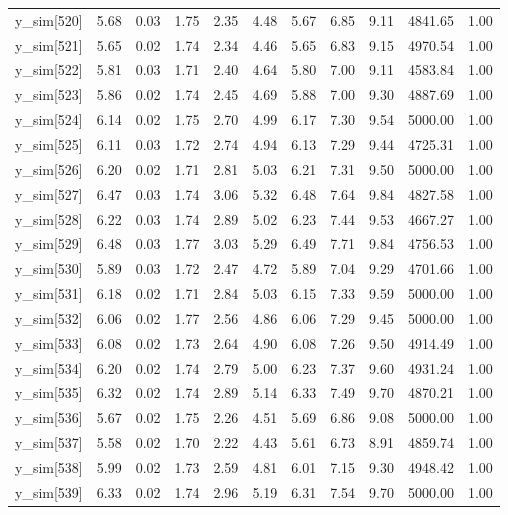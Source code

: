 \begin{table}[ht]
\begin{tabular}{rrrrrrrrrrr}
  y\_sim[520] & 5.68 & 0.03 & 1.75 & 2.35 & 4.48 & 5.67 & 6.85 & 9.11 & 4841.65 & 1.00 \\ 
  y\_sim[521] & 5.65 & 0.02 & 1.74 & 2.34 & 4.46 & 5.65 & 6.83 & 9.15 & 4970.54 & 1.00 \\ 
  y\_sim[522] & 5.81 & 0.03 & 1.71 & 2.40 & 4.64 & 5.80 & 7.00 & 9.11 & 4583.84 & 1.00 \\ 
  y\_sim[523] & 5.86 & 0.02 & 1.74 & 2.45 & 4.69 & 5.88 & 7.00 & 9.30 & 4887.69 & 1.00 \\ 
  y\_sim[524] & 6.14 & 0.02 & 1.75 & 2.70 & 4.99 & 6.17 & 7.30 & 9.54 & 5000.00 & 1.00 \\ 
  y\_sim[525] & 6.11 & 0.03 & 1.72 & 2.74 & 4.94 & 6.13 & 7.29 & 9.44 & 4725.31 & 1.00 \\ 
  y\_sim[526] & 6.20 & 0.02 & 1.71 & 2.81 & 5.03 & 6.21 & 7.31 & 9.50 & 5000.00 & 1.00 \\ 
  y\_sim[527] & 6.47 & 0.03 & 1.74 & 3.06 & 5.32 & 6.48 & 7.64 & 9.84 & 4827.58 & 1.00 \\ 
  y\_sim[528] & 6.22 & 0.03 & 1.74 & 2.89 & 5.02 & 6.23 & 7.44 & 9.53 & 4667.27 & 1.00 \\ 
  y\_sim[529] & 6.48 & 0.03 & 1.77 & 3.03 & 5.29 & 6.49 & 7.71 & 9.84 & 4756.53 & 1.00 \\ 
  y\_sim[530] & 5.89 & 0.03 & 1.72 & 2.47 & 4.72 & 5.89 & 7.04 & 9.29 & 4701.66 & 1.00 \\ 
  y\_sim[531] & 6.18 & 0.02 & 1.71 & 2.84 & 5.03 & 6.15 & 7.33 & 9.59 & 5000.00 & 1.00 \\ 
  y\_sim[532] & 6.06 & 0.02 & 1.77 & 2.56 & 4.86 & 6.06 & 7.29 & 9.45 & 5000.00 & 1.00 \\ 
  y\_sim[533] & 6.08 & 0.02 & 1.73 & 2.64 & 4.90 & 6.08 & 7.26 & 9.50 & 4914.49 & 1.00 \\ 
  y\_sim[534] & 6.20 & 0.02 & 1.74 & 2.79 & 5.00 & 6.23 & 7.37 & 9.60 & 4931.24 & 1.00 \\ 
  y\_sim[535] & 6.32 & 0.02 & 1.74 & 2.89 & 5.14 & 6.33 & 7.49 & 9.70 & 4870.21 & 1.00 \\ 
  y\_sim[536] & 5.67 & 0.02 & 1.75 & 2.26 & 4.51 & 5.69 & 6.86 & 9.08 & 5000.00 & 1.00 \\ 
  y\_sim[537] & 5.58 & 0.02 & 1.70 & 2.22 & 4.43 & 5.61 & 6.73 & 8.91 & 4859.74 & 1.00 \\ 
  y\_sim[538] & 5.99 & 0.02 & 1.73 & 2.59 & 4.81 & 6.01 & 7.15 & 9.30 & 4948.42 & 1.00 \\ 
  y\_sim[539] & 6.33 & 0.02 & 1.74 & 2.96 & 5.19 & 6.31 & 7.54 & 9.70 & 5000.00 & 1.00 \\ 

\end{tabular}
\end{table}
